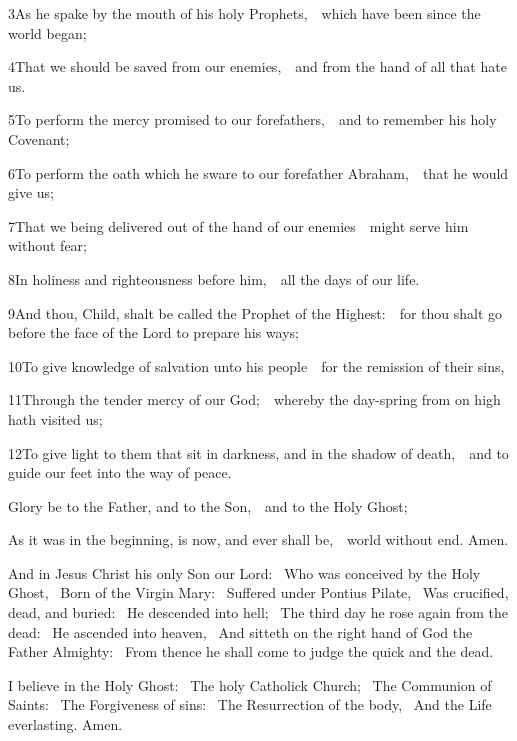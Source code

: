 3\enspace As he spake by the mouth of his holy Prophets,\ \star\ which have been since the world began;

4\enspace That we should be saved from our enemies,\ \star\ and from the hand of all that hate us.

5\enspace To perform the mercy promised to our forefathers,\ \star\ and to remember his holy Covenant;

6\enspace To perform the oath which he sware to our forefather Abraham,\ \star\ that he would give us;

7\enspace That we being delivered out of the hand of our enemies\ \star\ might serve him without fear;

8\enspace In holiness and righteousness before him,\ \star\ all the days of our life.

9\enspace And thou, Child, shalt be called the Prophet of the Highest:\ \star\ for thou shalt go before the face of the Lord to prepare his ways;

10\enspace To give knowledge of salvation unto his people\ \star\ for the remission of their sins,

11\enspace Through the tender mercy of our God;\ \star\ whereby the day-spring from on high hath visited us;

12\enspace To give light to them that sit in darkness, and in the shadow of death,\ \star\ and to guide our feet into the way of peace.

Glory be to the Father, and to the Son,\ \star\ and to the Holy Ghost;

As it was in the beginning, is now, and ever shall be,\ \star\ world without end. Amen.

\bigskip
{}


And in Jesus Christ his only Son our Lord: \ Who was conceived by the Holy Ghost, \ Born of the Virgin Mary: \ Suffered under Pontius Pilate, \ Was crucified, dead, and buried: \ He descended into hell; \ The third day he rose again from the dead: \ He ascended into heaven, \ And sitteth on the right hand of God the Father Almighty: \ From thence he shall come to judge the quick and the dead.

I believe in the Holy Ghost: \ The holy Catholick Church; \ The Communion of Saints: \ The Forgiveness of sins: \ The Resurrection of the body, \ And the Life everlasting. Amen.


